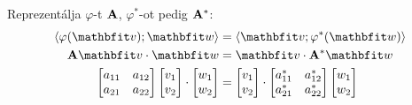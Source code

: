 \begin{note}
  Reprezentálja $\varphi$-t $\mathbf{A}$,
  $\varphi^*$-ot pedig $\mathbf{A}^*$:
  \begin{align*}
    \scalar{\varphi(\rvec v)}{\rvec w}
     & =
    \scalar{\rvec v}{\varphi^*(\rvec w)}
    \\
    \rmat A\rvec v \cdot \rvec w
     & =
    \rvec v \cdot \rmat A^* \rvec w
    \\
    \begin{bmatrix}
      a_{11} & a_{12} \\
      a_{21} & a_{22}
    \end{bmatrix}
    \begin{bmatrix}
      v_1 \\
      v_2
    \end{bmatrix}
    \cdot
    \begin{bmatrix}
      w_1 \\
      w_2
    \end{bmatrix}
     & =
    \begin{bmatrix}
      v_1 \\
      v_2
    \end{bmatrix}
    \cdot
    \begin{bmatrix}
      a_{11}^* & a_{12}^* \\
      a_{21}^* & a_{22}^*
    \end{bmatrix}
    \begin{bmatrix}
      w_1 \\
      w_2
    \end{bmatrix}
    \\

\end{align*}
\end{note}

